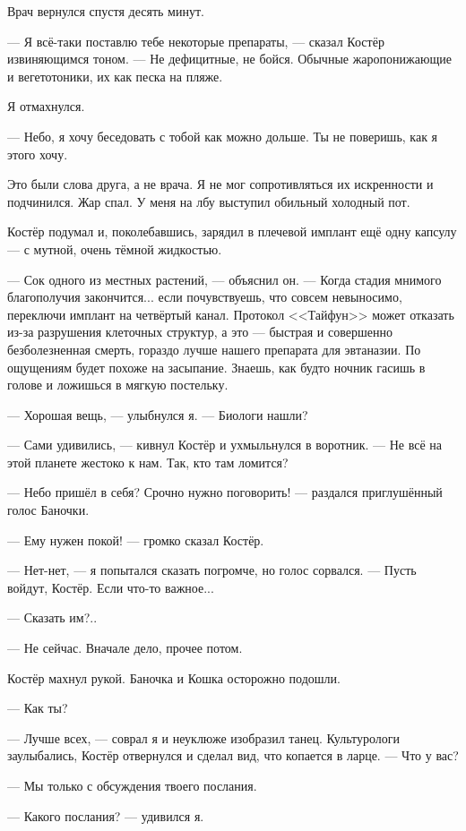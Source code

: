Врач вернулся спустя десять минут.

--- Я всё-таки поставлю тебе некоторые препараты, --- сказал Костёр извиняющимся тоном.
--- Не дефицитные, не бойся.
Обычные жаропонижающие и вегетотоники, их как песка на пляже.

Я отмахнулся.

--- Небо, я хочу беседовать с тобой как можно дольше.
Ты не поверишь, как я этого хочу.

Это были слова друга, а не врача.
Я не мог сопротивляться их искренности и подчинился.
Жар спал.
У меня на лбу выступил обильный холодный пот.

Костёр подумал и, поколебавшись, зарядил в плечевой имплант ещё одну капсулу --- с мутной, очень тёмной жидкостью.

--- Сок одного из местных растений, --- объяснил он.
--- Когда стадия мнимого благополучия закончится... если почувствуешь, что совсем невыносимо, переключи имплант на четвёртый канал.
Протокол <<Тайфун>> может отказать из-за разрушения клеточных структур, а это --- быстрая и совершенно безболезненная смерть, гораздо лучше нашего препарата для эвтаназии.
По ощущениям будет похоже на засыпание.
Знаешь, как будто ночник гасишь в голове и ложишься в мягкую постельку.

--- Хорошая вещь, --- улыбнулся я.
--- Биологи нашли?

--- Сами удивились, --- кивнул Костёр и ухмыльнулся в воротник.
--- Не всё на этой планете жестоко к нам.
Так, кто там ломится?

--- Небо пришёл в себя? Срочно нужно поговорить! --- раздался приглушённый голос Баночки.

--- Ему нужен покой! --- громко сказал Костёр.

--- Нет-нет, --- я попытался сказать погромче, но голос сорвался.
--- Пусть войдут, Костёр.
Если что-то важное...

--- Сказать им?..

--- Не сейчас.
Вначале дело, прочее потом.

Костёр махнул рукой. Баночка и Кошка осторожно подошли.

--- Как ты?

--- Лучше всех, --- соврал я и неуклюже изобразил танец.
Культурологи заулыбались, Костёр отвернулся и сделал вид, что копается в ларце.
--- Что у вас?

--- Мы только с обсуждения твоего послания.

--- Какого послания? --- удивился я.

